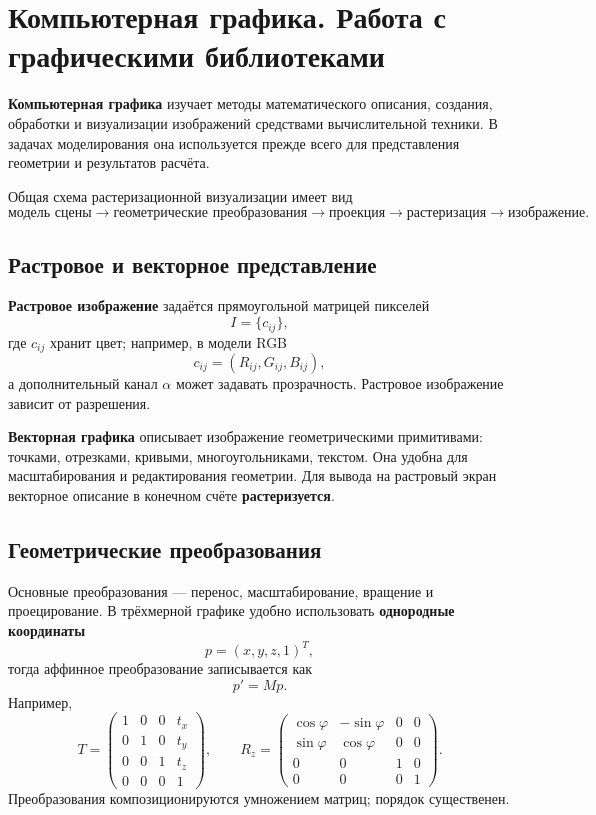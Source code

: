 \section{Компьютерная графика. Работа с графическими библиотеками}

\textbf{Компьютерная графика} изучает методы математического описания, создания, обработки и визуализации изображений средствами вычислительной техники. В задачах моделирования она используется прежде всего для представления геометрии и результатов расчёта.

Общая схема растеризационной визуализации имеет вид
\[
\text{модель сцены}
\rightarrow
\text{геометрические преобразования}
\rightarrow
\text{проекция}
\rightarrow
\text{растеризация}
\rightarrow
\text{изображение}.
\]

\subsection{Растровое и векторное представление}

\textbf{Растровое изображение} задаётся прямоугольной матрицей пикселей
\[
I=\{c_{ij}\},
\]
где $c_{ij}$ хранит цвет; например, в модели RGB
\[
c_{ij}=(R_{ij},G_{ij},B_{ij}),
\]
а дополнительный канал $\alpha$ может задавать прозрачность. Растровое изображение зависит от разрешения.

\textbf{Векторная графика} описывает изображение геометрическими примитивами: точками, отрезками, кривыми, многоугольниками, текстом. Она удобна для масштабирования и редактирования геометрии. Для вывода на растровый экран векторное описание в конечном счёте \textbf{растеризуется}.

\subsection{Геометрические преобразования}

Основные преобразования --- перенос, масштабирование, вращение и проецирование. В трёхмерной графике удобно использовать \textbf{однородные координаты}
\[
p=(x,y,z,1)^T,
\]
тогда аффинное преобразование записывается как
\[
p'=Mp.
\]
Например,
\[
T=
\begin{pmatrix}
1&0&0&t_x\\
0&1&0&t_y\\
0&0&1&t_z\\
0&0&0&1
\end{pmatrix},
\qquad
R_z=
\begin{pmatrix}
\cos\varphi&-\sin\varphi&0&0\\
\sin\varphi& \cos\varphi&0&0\\
0&0&1&0\\
0&0&0&1
\end{pmatrix}.
\]
Преобразования композиционируются умножением матриц; порядок существенен.


